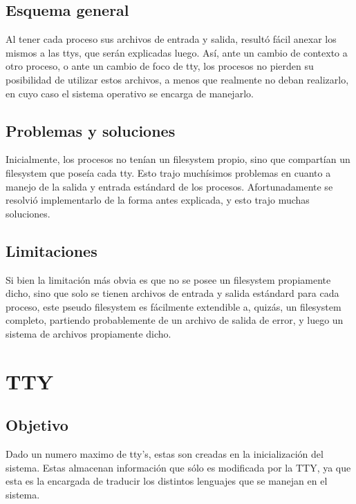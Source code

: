 \documentclass[10pt,a4paper]{article}
\begin{document}
	\subsection{Esquema general}
		Al tener cada proceso sus archivos de entrada y salida, result\'o f\'acil anexar los mismos a las ttys, que ser\'an explicadas luego. As\'i, ante un cambio de contexto a otro proceso, o ante un cambio de foco de tty, los procesos no pierden su posibilidad de utilizar estos archivos, a menos que realmente no deban realizarlo, en cuyo caso el sistema operativo se encarga de manejarlo.	
	\subsection{Problemas y soluciones}
		Inicialmente, los procesos no ten\'ian un filesystem propio, sino que compart\'ian un filesystem que pose\'ia cada tty. Esto trajo much\'isimos problemas en cuanto a manejo de la salida y entrada est\'andard de los procesos. Afortunadamente se resolvi\'o implementarlo de la forma antes explicada, y esto trajo muchas soluciones.
	\subsection{Limitaciones}
		Si bien la limitaci\'on m\'as obvia es que no se posee un filesystem propiamente dicho, sino que solo se tienen archivos de entrada y salida est\'andard para cada proceso, este pseudo filesystem es f\'acilmente extendible a, quiz\'as, un filesystem completo, partiendo probablemente de un archivo de salida de error, y luego un sistema de archivos propiamente dicho.
\newpage
\section{TTY}
	\subsection{Objetivo}
		Dado un numero maximo de tty's, estas son creadas en la inicializaci\'on del  sistema. Estas almacenan informaci\'on que s\'olo es modificada por la TTY, ya que esta es la encargada de traducir los distintos lenguajes que se manejan en el sistema. 
\end{document}
